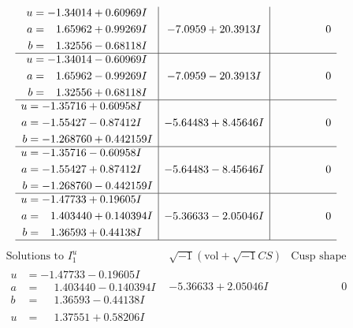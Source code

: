 \documentclass[1p]{elsarticle_modified}
\theoremstyle{definition}
\newcommand{\I}{\sqrt{-1}}
\begin{document}
$$\begin{array}{c|c|c}
\begin{aligned}
u &= -1.34014 + 0.60969 I \\
a &= \phantom{-}1.65962 + 0.99269 I \\
b &= \phantom{-}1.32556 - 0.68118 I\end{aligned}
 & -7.0959 + 20.3913 I & \phantom{-0.000000 } 0 \\ \hline\begin{aligned}
u &= -1.34014 - 0.60969 I \\
a &= \phantom{-}1.65962 - 0.99269 I \\
b &= \phantom{-}1.32556 + 0.68118 I\end{aligned}
 & -7.0959 - 20.3913 I & \phantom{-0.000000 } 0 \\ \hline\begin{aligned}
u &= -1.35716 + 0.60958 I \\
a &= -1.55427 - 0.87412 I \\
b &= -1.268760 + 0.442159 I\end{aligned}
 & -5.64483 + 8.45646 I & \phantom{-0.000000 } 0 \\ \hline\begin{aligned}
u &= -1.35716 - 0.60958 I \\
a &= -1.55427 + 0.87412 I \\
b &= -1.268760 - 0.442159 I\end{aligned}
 & -5.64483 - 8.45646 I & \phantom{-0.000000 } 0 \\ \hline\begin{aligned}
u &= -1.47733 + 0.19605 I \\
a &= \phantom{-}1.403440 + 0.140394 I \\
b &= \phantom{-}1.36593 + 0.44138 I\end{aligned}
 & -5.36633 - 2.05046 I & \phantom{-0.000000 } 0\\
 \hline 
 \end{array}$$\newpage$$\begin{array}{c|c|c}  
\text{Solutions to }I^u_{1}& \I (\text{vol} + \sqrt{-1}CS) & \text{Cusp shape}\\
 \hline 
\begin{aligned}
u &= -1.47733 - 0.19605 I \\
a &= \phantom{-}1.403440 - 0.140394 I \\
b &= \phantom{-}1.36593 - 0.44138 I\end{aligned}
 & -5.36633 + 2.05046 I & \phantom{-0.000000 } 0 \\ \hline\begin{aligned}
u &= \phantom{-}1.37551 + 0.58206 I \\

\end{aligned}
\end{array}$$
\end{document}
